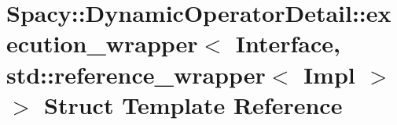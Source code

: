 \hypertarget{structSpacy_1_1DynamicOperatorDetail_1_1execution__wrapper_3_01Interface_00_01std_1_1reference__wrapper_3_01Impl_01_4_01_4}{\section{\-Spacy\-:\-:\-Dynamic\-Operator\-Detail\-:\-:execution\-\_\-wrapper$<$ \-Interface, std\-:\-:reference\-\_\-wrapper$<$ \-Impl $>$ $>$ \-Struct \-Template \-Reference}
\label{structSpacy_1_1DynamicOperatorDetail_1_1execution__wrapper_3_01Interface_00_01std_1_1reference__wrapper_3_01Impl_01_4_01_4}
}
